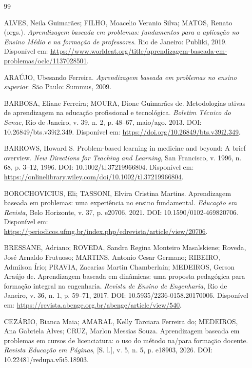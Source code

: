 \begin{thebibliography}{99}


ALVES, Neila Guimarães; FILHO, Moacelio Veranio Silva; MATOS, Renato (orgs.). \textit{Aprendizagem baseada em problemas: fundamentos para a aplicação no Ensino Médio e na formação de professores}. Rio de Janeiro: Publiki, 2019. Disponível em: \url{https://www.worldcat.org/title/aprendizagem-baseada-em-problemas/oclc/1137028501}.


ARAÚJO, Ubesando Ferreira. \textit{Aprendizagem baseada em problemas no ensino superior}. São Paulo: Summus, 2009.

BARBOSA, Eliane Ferreira; MOURA, Dione Guimarães de. Metodologias ativas de aprendizagem na educação profissional e tecnológica. \textit{Boletim Técnico do Senac}, Rio de Janeiro, v. 39, n. 2, p. 48--67, maio/ago. 2013. DOI: 10.26849/bts.v39i2.349. Disponível em: \url{https://doi.org/10.26849/bts.v39i2.349}.

BARROWS, Howard S. Problem-based learning in medicine and beyond: A brief overview. \textit{New Directions for Teaching and Learning}, San Francisco, v. 1996, n. 68, p. 3--12, 1996. DOI: 10.1002/tl.37219966804. Disponível em: \url{https://onlinelibrary.wiley.com/doi/10.1002/tl.37219966804}.

BOROCHOVICIUS, Eli; TASSONI, Elvira Cristina Martins. Aprendizagem baseada em problemas: uma experiência no ensino fundamental. \textit{Educação em Revista}, Belo Horizonte, v. 37, p. e20706, 2021. DOI: 10.1590/0102-469820706. Disponível em: \url{https://periodicos.ufmg.br/index.php/edrevista/article/view/20706}.

BRESSANE, Adriano; ROVEDA, Sandra Regina Monteiro Masalskiene; Roveda, José Arnaldo Frutuoso; MARTINS, Antonio Cesar Germano; RIBEIRO, Admilson Írio; PRAVIA, Zacarias Martin Chamberlain; MEDEIROS, Gerson Araújo de. Aprendizagem baseada em dinâmicas: uma proposta pedagógica para formação integral na engenharia. \textit{Revista de Ensino de Engenharia}, Rio de Janeiro, v. 36, n. 1, p. 59--71, 2017. DOI: 10.5935/2236-0158.20170006. Disponível em: \url{https://revista.abenge.org.br/abenge/article/view/540}.

CEZÁRIO, Bianca Maia; AMARAL, Kelly Tarciara Ferreira do; MEDEIROS, Ana Gabriela Alves; CRUZ, Marlon Messias Souza. Aprendizagem baseada em problemas em cursos de licenciatura: o uso do método na/para formação docente. \textit{Revista Educação em Páginas}, [S. l.], v. 5, n. 5, p. e18903, 2026. DOI: 10.22481/redupa.v5i5.18903.


\end{thebibliography}
